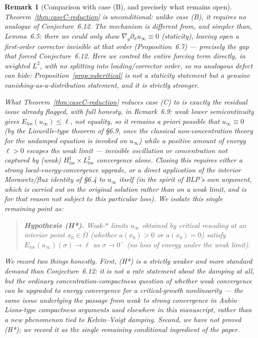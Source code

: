 \documentclass[11pt,letterpaper]{amsart}
\newtheorem{remark}[theorem]{Remark}
\begin{document}
\begin{remark}[Comparison with case (B), and precisely what remains open]
\label{rem:caseC-honest}
Theorem~\ref{thm:caseC-reduction} is unconditional: unlike case (B), it requires
\emph{no} analogue of Conjecture~6.12. The mechanism is different from, and simpler than,
Lemma~6.5: there we could only show $\nabla_y\partial_\sigma u_\infty\equiv0$ (staticity),
leaving open a first-order corrector invisible at that order (Proposition~6.7) — precisely
the gap that forced Conjecture~6.12. Here we control the \emph{entire} forcing term directly,
in weighted $L^2$, with no splitting into leading/corrector order, so no analogous defect can
hide: Proposition~\ref{prop:subcritical} is not a staticity statement but a genuine
vanishing-as-a-distribution statement, and it is strictly stronger.

What Theorem~\ref{thm:caseC-reduction} reduces case (C) to is exactly the residual issue
already flagged, with full honesty, in Remark~6.9: weak lower semicontinuity gives
$E_{loc}(u_\infty)\le \ell$, not equality, so it remains a priori possible that $u_\infty
\equiv 0$ (by the Liouville-type theorem of \S6.9, once the classical non-concentration
theory for the \emph{undamped} equation is invoked on $u_\infty$) while a positive amount of
energy $\ell>0$ escapes the weak limit — invisible oscillation or concentration not captured
by (weak) $H^1_{loc}\times L^2_{loc}$ convergence alone. Closing this requires either a strong
local-energy-convergence upgrade, or a direct application of the interior Morawetz/flux
identity of \S6.4 to $u_\infty$ itself (in the spirit of BLP's own argument, which is carried
out on the original solution rather than on a weak limit, and is for that reason not subject
to this particular loss). We isolate this single remaining point as:

\begin{quote}
\textbf{Hypothesis (H*).} Weak-$*$ limits $u_\infty$ obtained by critical rescaling at an
interior point $x_0\in\overline\Omega$ (whether $a(x_0)>0$ or $a(x_0)=0$) satisfy
$E_{loc}(u_\infty)(\sigma) \to \ell$ as $\sigma\to0^-$ (no loss of energy under the weak limit).
\end{quote}

We record two things honestly. First, (H*) is a strictly weaker and more standard demand than
Conjecture~6.12: it is not a rate statement about the damping at all, but the ordinary
concentration-compactness question of whether weak convergence can be upgraded to energy
convergence for a critical-growth nonlinearity — the same issue underlying the passage from
weak to strong convergence in Aubin--Lions-type compactness arguments used elsewhere in this
manuscript, rather than a new phenomenon tied to Kelvin--Voigt damping. Second, we have not
proved (H*); we record it as the single remaining conditional ingredient of the paper.
\end{remark}
\end{document}
